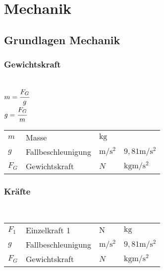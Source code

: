\documentclass[a4paper, 11pt]{article}
\begin{document}
\section{Mechanik}

\subsection{Grundlagen Mechanik}

\subsubsection{Gewichtskraft}
\begin{minipage}{0.45\textwidth}

 \\
$m = \cfrac{F_G}{g}$ \\
$g = \cfrac{F_G}{m}$

\end{minipage}
\begin{minipage}{0.45\textwidth}

\begin{tabular}{llll}
$m$ & Masse & $\si{\kilo\gram}$ & \\
$g$ & Fallbeschleunigung & $\si{\metre\per\square\second}$ & $9,81 \si{\metre\per\square\second}$ \\
$F_G$ & Gewichtskraft & $N$ & $\si{\kilogram\metre\per\square\second}$ \\
\end{tabular}

\end{minipage}

\subsubsection{Kräfte}
\begin{minipage}{0.45\textwidth}

 \\

\end{minipage}
\begin{minipage}{0.45\textwidth}

\begin{tabular}{llll}
$F_1$ & Einzelkraft 1 & $\si{\newton}$ & $\si{\kilo\gram}$ \\
$g$ & Fallbeschleunigung & $\si{\metre\per\square\second}$ & $9,81 \si{\metre\per\square\second}$ \\
$F_G$ & Gewichtskraft & $N$ & $\si{\kilogram\metre\per\square\second}$ \\
\end{tabular}

\end{minipage}
\end{document}
